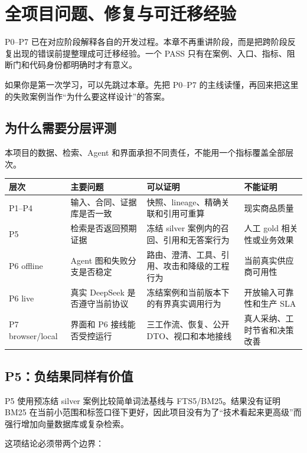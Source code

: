 \chapter{全项目问题、修复与可迁移经验}

\begin{beginnerbox}
P0--P7 已在对应阶段解释各自的开发过程。本章不再重讲阶段，而是把跨阶段反复出现的错误前提整理成可迁移经验。一个 PASS 只有在案例、入口、指标、阻断门和代码身份都明确时才有意义。

如果你是第一次学习，可以先跳过本章。先把 P0--P7 的主线读懂，再回来把这里的失败案例当作“为什么要这样设计”的答案。
\end{beginnerbox}

\section{为什么需要分层评测}

本项目的数据、检索、Agent 和界面承担不同责任，不能用一个指标覆盖全部层次。

\begin{longtable}{p{}p{}p{}p{}}
\toprule
层次 & 主要问题 & 可以证明 & 不能证明 \\
\midrule
P1--P4 & 输入、合同、证据库是否一致 & 快照、lineage、精确关联和引用可重算 & 现实商品质量 \\
P5 & 检索是否返回预期证据 & 冻结 silver 案例内的召回、引用和无答案行为 & 人工 gold 相关性或业务效果 \\
P6 offline & Agent 图和失败分支是否稳定 & 路由、澄清、工具、引用、攻击和降级的工程行为 & 当前真实供应商可用性 \\
P6 live & 真实 DeepSeek 是否遵守当前协议 & 冻结案例和当前版本下的有界真实调用行为 & 开放输入可靠性和生产 SLA \\
P7 browser/local & 界面和 P6 接线能否受控运行 & 三工作流、恢复、公开 DTO、视口和本地接线 & 真人采纳、工时节省和决策改善 \\
\bottomrule
\end{longtable}

\section{P5：负结果同样有价值}

P5 使用预冻结 silver 案例比较简单词法基线与 FTS5/BM25。结果没有证明 BM25 在当前小范围和标签口径下更好，因此项目没有为了“技术看起来更高级”而强行增加向量数据库或复杂检索。

这项结论必须带两个边界：

